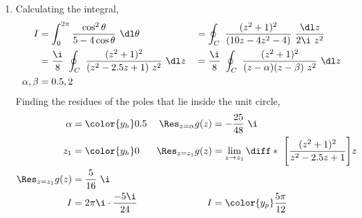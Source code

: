 \begin{enumerate}
    \item Calculating the integral,
          \begin{align}
              I             & = \int_{0}^{2\pi} \frac{\cos^2 \theta}
              {5 - 4\cos\theta} \ \dl \theta
                            &
                            & = \oint_C\ \frac{(z^2 + 1)^2}
              {(10z - 4z^2 - 4)} \ \frac{\dl z}{2\i\ z^2}                 \\
                            & = \frac{\i}{8}\ \oint_C\ \frac{(z^2 + 1)^2}
              {(z^2 - 2.5z + 1)\ z^2}
              \ \dl z       &
                            & = \frac{\i}{8}\ \oint_C\ \frac{(z^2 + 1)^2}
              {(z - \alpha)(z - \beta)\ z^2} \ \dl z                      \\
              \alpha, \beta & = 0.5, 2
          \end{align}
          Finding the residues of the poles that lie inside the unit circle,
          \begin{align}
              \alpha                 & = \color{y_h} 0.5                  &
              \Res_{z = \alpha} g(z) & = -\frac{25}{48}\ \i                 \\
              z_1                    & = \color{y_h} 0                    &
              \Res_{z = z_1} g(z)    & = \lim_{z \to z_1} \diff*{\ \Bigg[
              \frac{(z^2 + 1)^2}{z^2 - 2.5z + 1} \Bigg]}{z}                 \\
              \Res_{z = z_1} g(z)    & = \frac{5}{16}\ \i                   \\
              I                      & = 2\pi\i \cdot \frac{-5\i}{24}     &
              I                      & = \color{y_p} \frac{5\pi}{12}
          \end{align}


\end{enumerate}
